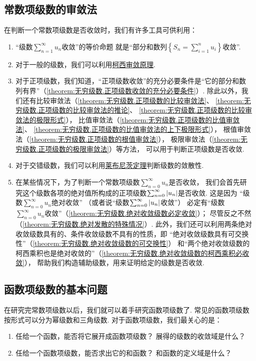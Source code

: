 \subsection*{常数项级数的审敛法}
在判断一个常数项级数是否收敛时，我们有许多工具可供利用：
\begin{enumerate}
	\item “级数\(\sum_{n=1}^\infty u_n\)收敛”的等价命题%
	就是“部分和数列\(\left\{ S_n = \sum_{i=1}^n u_i \right\}\)收敛”.

	\item
	对于一般的级数，我们可以利用\hyperref[theorem:无穷级数.级数的柯西审敛原理]{柯西审敛原理}.

	\item
	对于正项级数，我们知道，“正项级数收敛”的充分必要条件是“它的部分和数列有界”（\cref{theorem:无穷级数.正项级数收敛的充分必要条件}）.
	除此以外，我们还有比较审敛法（\cref{theorem:无穷级数.正项级数的比较审敛法}、%
	\cref{theorem:无穷级数.正项级数的比较审敛法的推论}、%
	\cref{theorem:无穷级数.正项级数的比较审敛法的极限形式}），
	比值审敛法（\cref{theorem:无穷级数.正项级数的比值审敛法}、%
	\cref{theorem:无穷级数.正项级数的比值审敛法的上下极限形式}），
	根值审敛法（\cref{theorem:无穷级数.正项级数的根值审敛法}），
	极限审敛法（\cref{theorem:无穷级数.正项级数的极限审敛法}）等方法，
	可以用于判断正项级数是否收敛.

	\item
	对于交错级数，我们可以利用\hyperref[theorem:无穷级数.莱布尼茨定理]{莱布尼茨定理}判断级数的敛散性.

	\item
	在某些情况下，为了判断一个常数项级数\(\sum_{n=0}^\infty u_n\)是否收敛，
	我们会首先研究这个级数各项的绝对值所构成的正项级数\(\sum_{n=0}^\infty \abs{u_n}\)是否收敛.
	这是因为%
	“级数\(\sum_{n=0}^\infty u_n\)绝对收敛”%
	（或者说“级数\(\sum_{n=0}^\infty \abs{u_n}\)收敛”）%
	必定有“级数\(\sum_{n=0}^\infty u_n\)收敛”（\cref{theorem:无穷级数.绝对收敛级数必定收敛}）；
	尽管反之不然（\cref{theorem:无穷级数.绝对发散的特殊情况}）.
	此外，我们还可以利用两条绝对收敛级数具有的、条件收敛级数不具有的性质，即%
	“绝对收敛级数具有可交换性”（\cref{theorem:无穷级数.绝对收敛级数的可交换性}）%
	和“两个绝对收敛级数的柯西乘积也是绝对收敛的”（\cref{theorem:无穷级数.绝对收敛级数的柯西乘积必收敛}），
	帮助我们构造辅助级数，用来证明给定的级数是否收敛.
\end{enumerate}

\subsection*{函数项级数的基本问题}
在研究完常数项级数以后，我们就可以着手研究函数项级数了.
常见的函数项级数按形式可以分为幂级数和三角级数.
对于函数项级数，我们最关心的是：
\begin{enumerate}
	\item 任给一个函数，能否将它展开成函数项级数？
	展得的级数的收敛域是什么？
	\item 任给一个函数项级数，能否求出它的和函数？
	和函数的定义域是什么？
\end{enumerate}

